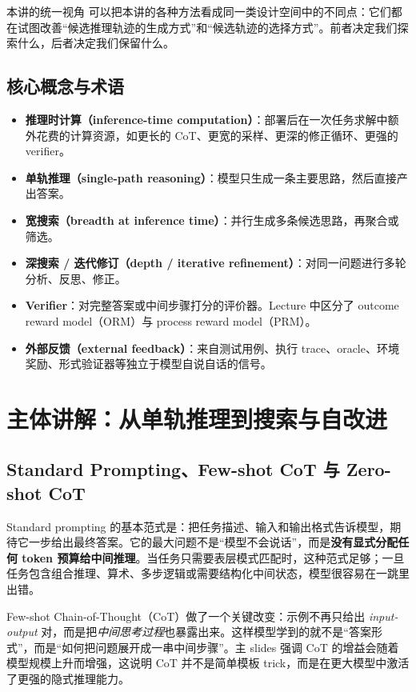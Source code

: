 \begin{knowledgebox}{本讲的统一视角}
可以把本讲的各种方法看成同一类设计空间中的不同点：它们都在试图改善“候选推理轨迹的生成方式”和“候选轨迹的选择方式”。前者决定我们探索什么，后者决定我们保留什么。
\end{knowledgebox}

\subsection{核心概念与术语}

\begin{itemize}
\item \textbf{推理时计算（inference-time computation）}：部署后在一次任务求解中额外花费的计算资源，如更长的 CoT、更宽的采样、更深的修正循环、更强的 verifier。
\item \textbf{单轨推理（single-path reasoning）}：模型只生成一条主要思路，然后直接产出答案。
\item \textbf{宽搜索（breadth at inference time）}：并行生成多条候选思路，再聚合或筛选。
\item \textbf{深搜索 / 迭代修订（depth / iterative refinement）}：对同一问题进行多轮分析、反思、修正。
\item \textbf{Verifier}：对完整答案或中间步骤打分的评价器。Lecture 中区分了 outcome reward model（ORM）与 process reward model（PRM）。
\item \textbf{外部反馈（external feedback）}：来自测试用例、执行 trace、oracle、环境奖励、形式验证器等独立于模型自说自话的信号。
\end{itemize}

\section{主体讲解：从单轨推理到搜索与自改进}

\subsection{Standard Prompting、Few-shot CoT 与 Zero-shot CoT}

Standard prompting 的基本范式是：把任务描述、输入和输出格式告诉模型，期待它一步给出最终答案。它的最大问题不是“模型不会说话”，而是\textbf{没有显式分配任何 token 预算给中间推理}。当任务只需要表层模式匹配时，这种范式足够；一旦任务包含组合推理、算术、多步逻辑或需要结构化中间状态，模型很容易在一跳里出错。

Few-shot Chain-of-Thought（CoT）做了一个关键改变：示例不再只给出 \emph{input-output} 对，而是把\emph{中间思考过程}也暴露出来。这样模型学到的就不是“答案形式”，而是“如何把问题展开成一串中间步骤”。主 slides 强调 CoT 的增益会随着模型规模上升而增强，这说明 CoT 并不是简单模板 trick，而是在更大模型中激活了更强的隐式推理能力。

